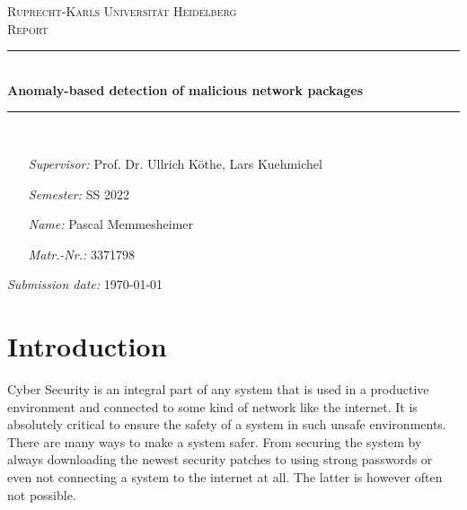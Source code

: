 \documentclass[]{article}
\begin{document}
	
	\begin{titlepage}
		\thispagestyle{empty}
		\newcommand{\HRule}{\rule{\linewidth}{0.5mm}}
		\hspace{1cm}
		\center
		
		\textsc{\huge Ruprecht-Karls Universität Heidelberg}\\[2.0cm]
		
		\textsc{\Large Report}\\[1.0cm]
		
		\HRule\\[1.4cm]
		
		{ \huge \bfseries Anomaly-based detection of malicious network packages}\\[0.8cm]
		\HRule \\[8.4cm]
		
		
		\begin{minipage}[t]{0.8\textwidth}
			\begin{itemize}
				\item[\emph{Supervisor:}] Prof. Dr. Ullrich Köthe, Lars Kuehmichel
				\item[\emph{Semester:}] SS 2022
				\item[\emph{Name:}] Pascal Memmesheimer
				\item[\emph{Matr.-Nr.:}] 3371798
			\end{itemize}
		\end{minipage}
		
		\vspace{2.5cm}
		
		\flushright \emph{Submission date:} \today
	\end{titlepage}
	\restoregeometry
	
	\tableofcontents
	
	\newpage

	\section{Introduction}

Cyber Security is an integral part of any system that is used in a productive environment and connected to some kind of network like the internet. It is absolutely critical to ensure the safety of a system in such unsafe environments. There are many ways to make a system safer. From securing the system by always downloading the newest security patches to using strong passwords or even not connecting a system to the internet at all. The latter is however often not possible. 
\newline
\end{document}
